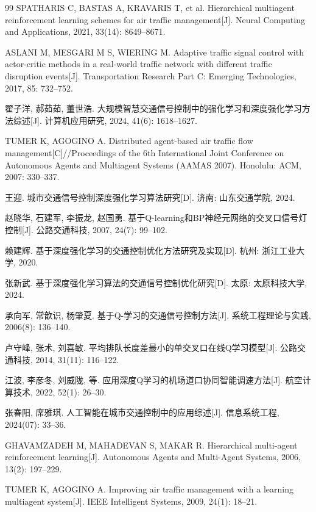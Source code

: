 \documentclass[12pt,a4paper,UTF8]{ctexbook}
\begin{document}
\begin{thebibliography}{99}
 SPATHARIS C, BASTAS A, KRAVARIS T, et al. Hierarchical multiagent reinforcement learning schemes for air traffic management[J]. Neural Computing and Applications, 2021, 33(14): 8649--8671.

 ASLANI M, MESGARI M S, WIERING M. Adaptive traffic signal control with actor-critic methods in a real-world traffic network with different traffic disruption events[J]. Transportation Research Part C: Emerging Technologies, 2017, 85: 732--752.

 翟子洋, 郝茹茹, 董世浩. 大规模智慧交通信号控制中的强化学习和深度强化学习方法综述[J]. 计算机应用研究, 2024, 41(6): 1618--1627.

 TUMER K, AGOGINO A. Distributed agent-based air traffic flow management[C]//Proceedings of the 6th International Joint Conference on Autonomous Agents and Multiagent Systems (AAMAS 2007). Honolulu: ACM, 2007: 330--337.

 王迎. 城市交通信号控制深度强化学习算法研究[D]. 济南: 山东交通学院, 2024.

 赵晓华, 石建军, 李振龙, 赵国勇. 基于Q-learning和BP神经元网络的交叉口信号灯控制[J]. 公路交通科技, 2007, 24(7): 99--102.

 赖建辉. 基于深度强化学习的交通控制优化方法研究及实现[D]. 杭州: 浙江工业大学, 2020.

 张新武. 基于深度强化学习算法的交通信号控制优化研究[D]. 太原: 太原科技大学, 2024.

 承向军, 常歆识, 杨肇夏. 基于Q-学习的交通信号控制方法[J]. 系统工程理论与实践, 2006(8): 136--140.

 卢守峰, 张术, 刘喜敏. 平均排队长度差最小的单交叉口在线Q学习模型[J]. 公路交通科技, 2014, 31(11): 116--122.

 江波, 李彦冬, 刘威陇, 等. 应用深度Q学习的机场道口协同智能调速方法[J]. 航空计算技术, 2022, 52(1): 26--30.

 张春阳, 席雅琪. 人工智能在城市交通控制中的应用综述[J]. 信息系统工程, 2024(07): 33--36.

 GHAVAMZADEH M, MAHADEVAN S, MAKAR R. Hierarchical multi-agent reinforcement learning[J]. Autonomous Agents and Multi-Agent Systems, 2006, 13(2): 197--229.

 TUMER K, AGOGINO A. Improving air traffic management with a learning multiagent system[J]. IEEE Intelligent Systems, 2009, 24(1): 18--21.


\end{thebibliography}
\end{document}
